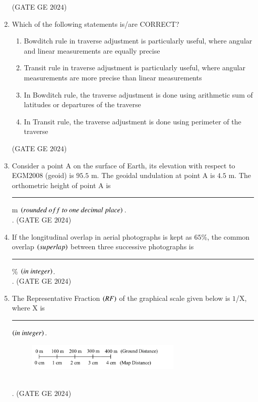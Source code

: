 \documentclass[journal,12pt,onecolumn]{IEEEtran}
\theoremstyle{remark}
\begin{document}
\begin{enumerate}
\begin{enumerate}
\end{enumerate}
\hfill{(GATE GE $2024$)}
\bigskip
\item Which of the following statements is/are CORRECT?
\begin{enumerate}
\item Bowditch rule in traverse adjustment is particularly useful, where angular and linear measurements are equally precise
\item Transit rule in traverse adjustment is particularly useful, where angular measurements are more precise than linear measurements
\item In Bowditch rule, the traverse adjustment is done using arithmetic sum of latitudes or departures of the traverse
\item In Transit rule, the traverse adjustment is done using perimeter of the traverse
\end{enumerate}
\hfill{(GATE GE $2024$)}
\bigskip
\item Consider a point A on the surface of Earth, its elevation with respect to EGM$2008$ (geoid) is $95.5$ m.
The geoidal undulation at point A is $4.5$ m. The orthometric height of point A is \rule{2cm}{0.5mm} m $\brak{rounded\ off\ to\ one\ decimal\ place}$.\\.
\hfill{(GATE GE $2024$)}
\bigskip
\item If the longitudinal overlap in aerial photographs is kept as $65$\%, the common overlap $\left(superlap\right)$ between three successive photographs is \rule{2cm}{0.5mm} \% $\left(in\ integer\right)$.\\.
\hfill{(GATE GE $2024$)}
\bigskip
\item The Representative Fraction $\left(RF\right)$ of the graphical scale given below is $1$/X, where X is \rule{2cm}{0.5mm} $\left(in\ integer\right)$.
\begin{figure}[h!]
    \centering
    \includegraphics[width=0.7\textwidth]{figs/fig8.png}
\end{figure}\\.
\hfill{(GATE GE $2024$)}
\bigskip


\end{enumerate}
\end{document}
